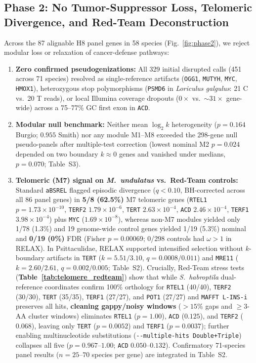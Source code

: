 \documentclass[10pt,a4paper,twocolumn]{article}
\begin{document}
\subsection{Phase 2: No Tumor-Suppressor Loss, Telomeric Divergence, and Red-Team Deconstruction}
Across the 87 alignable H8 panel genes in 58 species (Fig.~\ref{fig:phase2}), we reject modular loss or relaxation of cancer-defense pathways:
\begin{enumerate}
    \item \textbf{Zero confirmed pseudogenizations:} All 329 initial disrupted calls (451 across 71 species) resolved as single-reference artifacts (\texttt{OGG1}, \texttt{MUTYH}, \texttt{MYC}, \texttt{HMOX1}), heterozygous stop polymorphisms (\texttt{PSMD6} in \textit{Loriculus galgulus}: 21 C vs.\ 20 T reads), or local Illumina coverage dropouts ($0\times$ vs.\ $\sim 31\times$ gene-wide) across a 75--77\% GC first exon in \texttt{ACD}.
    \item \textbf{Modular null benchmark:} Neither mean $\log_2 k$ heterogeneity ($p = 0.164$ Burgio; $0.955$ Smith) nor any module M1--M8 exceeded the 298-gene null pseudo-panels after multiple-test correction (lowest nominal M2 $p = 0.024$ depended on two boundary $k \approx 0$ genes and vanished under medians, $p = 0.070$; Table~S3).
    \item \textbf{Telomeric (M7) signal on \textit{M.\ undulatus} vs.\ Red-Team controls:} Standard \texttt{aBSREL} flagged episodic divergence ($q < 0.10$, BH-corrected across all 86 panel genes) in \textbf{5/8 (62.5\%)} M7 telomeric genes (\texttt{RTEL1} $p = 1.73\times 10^{-10}$, \texttt{TERF2} $1.79\times 10^{-6}$, \texttt{TERT} $2.63\times 10^{-4}$, \texttt{ACD} $2.46\times 10^{-4}$, \texttt{TERF1} $3.98\times 10^{-4}$) plus \texttt{MYC} ($1.69\times 10^{-8}$), whereas non-M7 modules yielded only 1/78 (1.3\%) and 19 genome-wide control genes yielded 1/19 (5.3\%) nominal and \textbf{0/19 (0\%)} FDR (Fisher $p = 0.00069$; 0/298 controls had $\omega > 1$ in RELAX). In Psittaculidae, RELAX supported intensified selection without $k$-boundary artifacts in \texttt{TERT} ($k = 5.51/3.10$, $q = 0.0008/0.011$) and \texttt{MRE11} ($k = 2.60/2.61$, $q = 0.002/0.005$; Table~S2). Crucially, Red-Team stress tests (\textbf{Table~\ref{tab:telomere_redteam}}) show that while \textit{S.\ habroptila} dual-reference coordinates confirm 100\% orthology for \texttt{RTEL1} (40/40), \texttt{TERF2} (30/30), \texttt{TERT} (35/35), \texttt{TERF1} (27/27), and \texttt{POT1} (27/27) and \texttt{MAFFT L-INS-i} preserves all hits, \textbf{cleaning gappy/noisy windows} ($>15\%$ gaps and $\ge 3$-AA cluster windows) eliminates \texttt{RTEL1} ($p = 1.00$), \texttt{ACD} ($0.125$), and \texttt{TERF2} ($0.068$), leaving only \texttt{TERT} ($p = 0.0052$) and \texttt{TERF1} ($p = 0.0037$); further enabling multinucleotide substitutions (\texttt{-{}-multiple-hits Double+Triple}) collapses all five ($p = 0.967$--$1.00$; \texttt{ACD} $0.050$--$0.132$). Confirmatory 71-species panel results ($n = 25$--$70$ species per gene) are integrated in Table~S2.
\end{enumerate}
\end{document}
